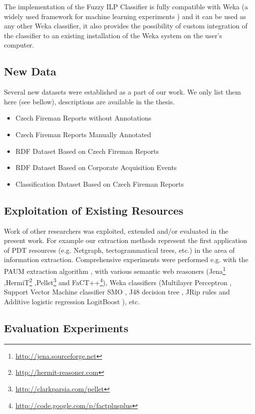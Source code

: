 \documentclass[12pt,a4paper,twoside,notitlepage]{article}
\begin{document}
The implementation of the Fuzzy ILP Classifier is fully compatible with Weka (a widely used framework for machine learning experiments \citep{biblio:Weka}) and it can be used as any other Weka classifier, it also provides the possibility of custom integration of the classifier to an existing installation of the Weka system on the user's computer.

\subsection{New Data}

Several new datasets were established as a part of our work. We only list them here (see bellow), descriptions are available in the thesis.

\begin{itemize}
	\item Czech Fireman Reports without Annotations 
	\item Czech Fireman Reports Manually Annotated 
	\item RDF Dataset Based on Czech Fireman Reports 
	\item RDF Dataset Based on Corporate Acquisition Events 
	\item Classification Dataset Based on Czech Fireman Reports 
\end{itemize}

\subsection{Exploitation of Existing Resources}

Work of other researchers was exploited, extended and/or evaluated in the present work. For example our extraction methods represent the first application of PDT resources (e.g. Netgraph, tectogrammatical trees, etc.) in the area of information extraction. Comprehensive experiments were performed e.g. with the PAUM extraction algorithm \citep{Li:Paum}, with various semantic web reasoners (Jena\footnote{\url{http://jena.sourceforge.net}}
,HermiT\footnote{\url{http://hermit-reasoner.com}}
,Pellet\footnote{\url{http://clarkparsia.com/pellet}}
and FaCT++\footnote{\url{http://code.google.com/p/factplusplus}}), Weka classifiers (Multilayer Perceptron \citep{biblio:bishop-1995},
Support Vector Machine classifier SMO \citep{biblio:SMO},
J48 decision tree \citep{biblio:J48},
JRip rules \citep{weka:JRip} and
Additive logistic regression LogitBoost \citep{biblio:LogitBoost}), etc.

\subsection{Evaluation Experiments}
\end{document}
